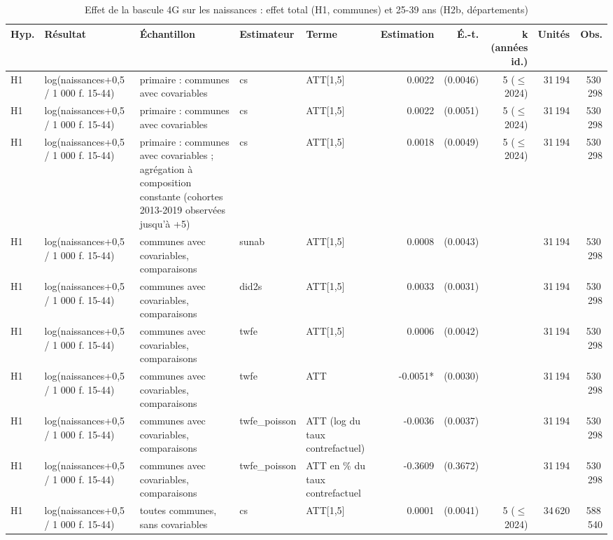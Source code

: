 \begin{table}\centering
\begin{threeparttable}
\caption{Effet de la bascule 4G sur les naissances : effet total (H1, communes) et 25-39 ans (H2b, départements)}\label{tab:main}
\scriptsize
\begin{tabular}{lp{3.8cm}p{6.5cm}lp{3.5cm}rrrrr}
\toprule
Hyp. & Résultat & Échantillon & Estimateur & Terme & Estimation & É.-t. & k (années id.) & Unités & Obs. \\
\midrule
H1 & log(naissances+0,5 / 1 000 f. 15-44) & primaire : communes avec covariables & cs & ATT[1,5] & 0.0022 & (0.0046) & 5 ($\leq$ 2024) & 31\,194 & 530\,298 \\
H1 & log(naissances+0,5 / 1 000 f. 15-44) & primaire : communes avec covariables & cs & ATT[1,5] & 0.0022 & (0.0051) & 5 ($\leq$ 2024) & 31\,194 & 530\,298 \\
H1 & log(naissances+0,5 / 1 000 f. 15-44) & primaire : communes avec covariables ; agrégation à composition constante (cohortes 2013-2019 observées jusqu'à +5) & cs & ATT[1,5] & 0.0018 & (0.0049) & 5 ($\leq$ 2024) & 31\,194 & 530\,298 \\
H1 & log(naissances+0,5 / 1 000 f. 15-44) & communes avec covariables, comparaisons & sunab & ATT[1,5] & 0.0008 & (0.0043) &  & 31\,194 & 530\,298 \\
H1 & log(naissances+0,5 / 1 000 f. 15-44) & communes avec covariables, comparaisons & did2s & ATT[1,5] & 0.0033 & (0.0031) &  & 31\,194 & 530\,298 \\
H1 & log(naissances+0,5 / 1 000 f. 15-44) & communes avec covariables, comparaisons & twfe & ATT[1,5] & 0.0006 & (0.0042) &  & 31\,194 & 530\,298 \\
H1 & log(naissances+0,5 / 1 000 f. 15-44) & communes avec covariables, comparaisons & twfe & ATT & -0.0051* & (0.0030) &  & 31\,194 & 530\,298 \\
H1 & log(naissances+0,5 / 1 000 f. 15-44) & communes avec covariables, comparaisons & twfe\_poisson & ATT (log du taux contrefactuel) & -0.0036 & (0.0037) &  & 31\,194 & 530\,298 \\
H1 & log(naissances+0,5 / 1 000 f. 15-44) & communes avec covariables, comparaisons & twfe\_poisson & ATT en \% du taux contrefactuel & -0.3609 & (0.3672) &  & 31\,194 & 530\,298 \\
H1 & log(naissances+0,5 / 1 000 f. 15-44) & toutes communes, sans covariables & cs & ATT[1,5] & 0.0001 & (0.0041) & 5 ($\leq$ 2024) & 34\,620 & 588\,540 \\

\end{tabular}
\end{threeparttable}
\end{table}
